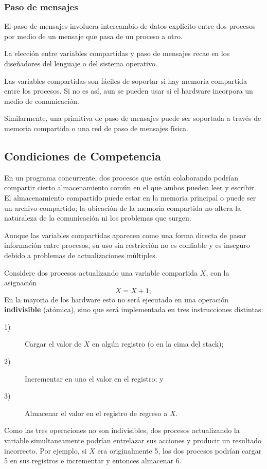 \documentclass{article}
\begin{document}
\subsubsection*{Paso de mensajes}
El paso de mensajes involucra intercambio de datos expl\'icito 
entre dos procesos por medio de un mensaje que pasa de un proceso a otro.

La elecci\'on entre variables compartidas y paso de mensajes 
recae en los dise\~nadores del lenguaje o del sistema operativo.

Las variables compartidas son f\'aciles de soportar 
si hay memoria compartida entre los procesos. Si no es as\'i, 
aun se pueden usar si el hardware incorpora un medio de 
comunicaci\'on.

Similarmente, una primitiva de paso de mensajes puede ser soportada 
a trav\'es de memoria compartida o una red de paso de mensajes 
f\'isica.

\subsection{Condiciones de Competencia}
En un programa concurrente, dos procesos que est\'an colaborando 
podr\'ian compartir cierto almacenamiento com\'un en el que ambos 
pueden leer y escribir. El almacenamiento compartido puede estar 
en la memoria principal o puede ser un archivo compartido; la 
ubicaci\'on de la memoria compartida no altera la naturaleza de 
la comunicaci\'on ni los problemas que surgen. 

Aunque las variables compartidas aparecen como una forma directa 
de pasar informaci\'on entre procesos, su uso sin restricci\'on 
no es conf\/iable y es inseguro debido a problemas de actualizaciones 
m\'ultiples.

Considere dos procesos actualizando una variable compartida $X$, 
con la asignaci\'on
$$
X=X+1;
$$
En la mayoria de los hardware esto no ser\'a ejecutado en una 
operaci\'on {\bf indivisible} (at\'omica), sino que ser\'a 
implementada en tres instrucciones distintas:
\begin{description}
\item[1)]Cargar el valor de $X$ en alg\'un registro (o en la cima 
del stack);
\item[2)]Incrementar en uno el valor en el registro; y
\item[3)]Almacenar el valor en el registro de regreso a $X$.
\end{description}
Como las tres operaciones no son indivisibles, dos procesos 
actualizando la variable simultaneamente podr\'ian entrelazar sus 
acciones y producir un resultado incorrecto. Por ejemplo, si $X$ 
era originalmente 5, los dos procesos podr\'ian cargar 5 en sus 
registros e incrementar y entonces almacenar 6.
\end{document}

